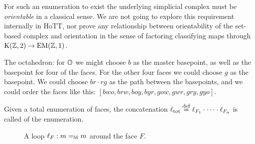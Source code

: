 \begin{mynote}
For such an enumeration to exist the underlying simplicial complex must be \emph{orientable} in a classical sense. We are not going to explore this requirement internally in HoTT, nor prove any relationship between orientability of the set-based complex and orientation in the sense of factoring classifying maps through \( \mathrm{K}(\mathbb{Z},2)\to\mathrm{EM}(\mathbb{Z},1) \).
\end{mynote}

\begin{myex}
The octahedron: for \( \mathbb{O} \) we might choose \( b \) as the master basepoint, as well as the basepoint for four of the faces. For the other four faces we could choose \( g \) as the basepoint. We could choose \( br\cdot rg \) as the path between the basepoints, and we could order the faces like this: \( [bwo, brw, boy, byr, gow, gwr, gry, gyo] \).
\end{myex}

\begin{mydef}
Given a total enumeration of faces, the concatenation \( \ell_{\mathrm{tot}}\stackrel{\mathrm{def}}{=}\ell_{F_1}\cdot\cdots\cdot\ell_{F_n} \) is called  of the enumeration.
\end{mydef}

\begin{figure}[h]
\centering
{}
\caption{A loop \( \ell_F:m=_{\mathbb{M}} m \) around the face \( F \).}
\label{fig:lasso}
\end{figure}

